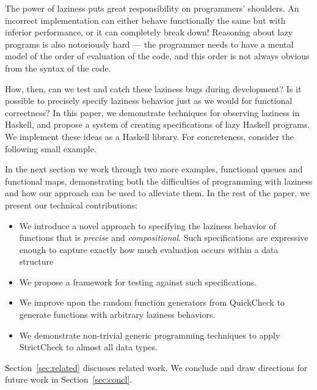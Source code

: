 \documentclass[acmsmall,review]{acmart}\settopmatter{}
\begin{document}
The power of laziness puts great responsibility on programmers'
shoulders. An incorrect implementation can either behave functionally
the same but with inferior performance, or it can completely break
down! Reasoning about lazy programs is also notoriously hard --- the
programmer needs to have a mental model of the order of evaluation of
the code, and this order is not always obvious from the syntax of the
code.

How, then, can we test and catch these laziness bugs during
development? Is it possible to precisely specify laziness behavior
just as we would for functional correctness?
%
In this paper, we demonstrate techniques for observing laziness in
Haskell, and propose a system of creating specifications of lazy
Haskell programs. We implement these ideas as a Haskell library. For
concreteness, consider the following small example.


In the next section we work through two more examples, functional
queues and functional maps, demonstrating both the difficulties of
programming with laziness and how our approach can be used to
alleviate them.
%
In the rest of the paper, we present our technical contributions:
\begin{itemize}
\item We introduce a novel approach to specifying the laziness behavior
of functions that is {\em precise} and {\em compositional}. Such
specifications are expressive enough to capture exactly how much
evaluation occurs within a data structure
\item We propose a framework for testing against such specifications.
\item We improve upon the random function generators from QuickCheck to generate functions with arbitrary laziness behaviors.
\item We demonstrate non-trivial generic programming techniques to apply StrictCheck to almost all data types.
\end{itemize}
%
Section~\ref{sec:related} discusses related work. We conclude and draw
directions for future work in Section~\ref{sec:concl}.

\end{document}
